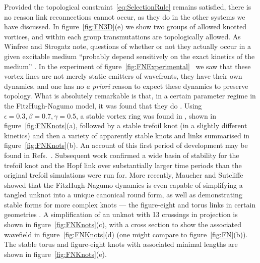 Provided the topological constraint~\eqref{eq:SelectionRule} remains satisfied, there is no reason link reconnections cannot occur, as they do in the other systems we have discussed. In figure~\ref{fig:FN3D}(e) we show two groups of allowed knotted vortices, and within each group transmutations are topologically allowed. As Winfree and Strogatz note, questions of whether or not they actually occur in a given excitable medium ``probably depend sensitively on the exact kinetics of the medium'' \citep{Winfree1984}. In the experiment of figure~\ref{fig:FNExperimental}~\citep{Totz2015} we saw that these vortex lines are not merely static emitters of wavefronts, they have their own dynamics, and one has no \emph{a priori} reason to expect these dynamics to preserve topology. What is absolutely remarkable is that, in a certain parameter regime in the FitzHugh-Nagumo model, it was found that they do \citep{Winfree1990,Henze1993}. Using $\epsilon = 0.3, \beta = 0.7, \gamma=0.5$, a stable vortex ring was found in \citep{Courtemanche1990}, shown in figure~\ref{fig:FNKnots}(a), followed by a stable trefoil knot \citep{Henze1991}(in a slightly different kinetics) and then a variety of apparently stable knots and links \citep{Henze1993} summarised in figure~\ref{fig:FNKnots}(b). An account of this first period of development may be found in Refs.~\citep{Winfree1990, WinfreeBook,WinfreeChapter}. Subsequent work \citep{Sutcliffe2003} confirmed a wide basin of stability for the trefoil knot and the Hopf link over substantially larger time periods than the original trefoil simulations were run for. More recently, Maucher and Sutcliffe \citep{Maucher2016} showed that the FitzHugh-Nagumo dynamics is even capable of simplifying a tangled unknot into a unique canonical round form, as well as demonstrating stable forms for more complex knots --- the figure-eight and torus links in certain geometries \citep{Maucher2017}. A simplification of an unknot with 13 crossings in projection is shown in figure~\ref{fig:FNKnots}(c), with a cross section to show the associated wavefield in figure~\ref{fig:FNKnots}(d) (one might compare to figure~\ref{fig:FN}(b)). The stable torus and figure-eight knots with associated minimal lengths are shown in figure~\ref{fig:FNKnots}(e).
